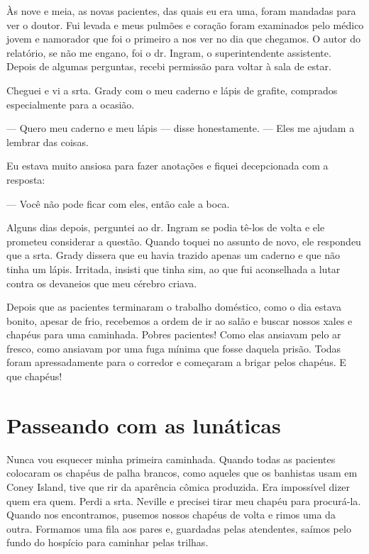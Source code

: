 Às nove e meia, as novas pacientes, das quais eu era uma, foram mandadas
para ver o doutor. Fui levada e meus pulmões e coração foram examinados
pelo médico jovem e namorador que foi o primeiro a nos ver no dia que
chegamos. O autor do relatório, se não me engano, foi o dr. Ingram, o
superintendente assistente. Depois de algumas perguntas, recebi
permissão para voltar à sala de estar.

Cheguei e vi a srta. Grady com o meu caderno e lápis de grafite,
comprados especialmente para a ocasião.

--- Quero meu caderno e meu lápis --- disse honestamente. --- Eles me
ajudam a lembrar das coisas.

Eu estava muito ansiosa para fazer anotações e fiquei decepcionada com a
resposta:

--- Você não pode ficar com eles, então cale a boca.

Alguns dias depois, perguntei ao dr. Ingram se podia tê-los de volta e
ele prometeu considerar a questão. Quando toquei no assunto de novo, ele
respondeu que a srta. Grady dissera que eu havia trazido apenas um
caderno e que não tinha um lápis. Irritada, insisti que tinha sim, ao
que fui aconselhada a lutar contra os devaneios que meu cérebro criava.

Depois que as pacientes terminaram o trabalho doméstico, como o dia
estava bonito, apesar de frio, recebemos a ordem de ir ao salão e buscar
nossos xales e chapéus para uma caminhada. Pobres pacientes! Como elas
ansiavam pelo ar fresco, como ansiavam por uma fuga mínima que fosse
daquela prisão. Todas foram apressadamente para o corredor e começaram a
brigar pelos chapéus. E que chapéus!


\label{section-6}

\chapter{Passeando com as
lunáticas}\label{capuxedtulo-xii-passeando-com-as-lunuxe1ticas}

Nunca vou esquecer minha primeira caminhada. Quando todas as pacientes
colocaram os chapéus de palha brancos, como aqueles que os banhistas
usam em Coney Island, tive que rir da aparência cômica produzida. Era
impossível dizer quem era quem. Perdi a srta. Neville e precisei tirar
meu chapéu para procurá-la. Quando nos encontramos, pusemos nossos
chapéus de volta e rimos uma da outra. Formamos uma fila aos pares e,
guardadas pelas atendentes, saímos pelo fundo do hospício para caminhar
pelas trilhas.

